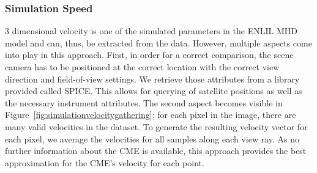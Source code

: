 \documentclass[journal]{vgtc}                %
\begin{document}
\subsubsection{Simulation Speed} \label{sec:simulationvelocity}
3 dimensional velocity is one of the simulated parameters in the ENLIL MHD model and can, thus, be extracted from the data. However, multiple aspects come into play in this approach. First, in order for a correct comparison, the scene camera has to be positioned at the correct location with the correct view direction and field-of-view settings. We retrieve those attributes from a library provided called SPICE. This allows for querying of satellite positions as well as the necessary instrument attributes. The second aspect becomes visible in Figure~\ref{fig:simulationvelocitygathering}; for each pixel in the image, there are many valid velocities in the dataset. To generate the resulting velocity vector for each pixel, we average the velocities for all samples along each view ray. As no further information about the CME is available, this approach provides the best approximation for the CME's velocity for each point.
\end{document}
